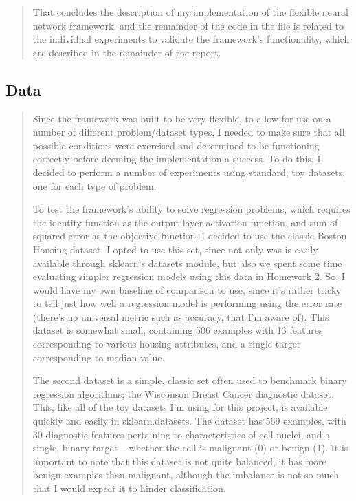 \documentclass{article}
\begin{document}
\begin{quote}
That concludes the description of my implementation of the flexible neural network framework, and the remainder of the code in the file is related to the individual experiments to validate the framework's functionality, which are described in the remainder of the report.

\end{quote}

\subsection*{Data}
\begin{quote}
\setlength{\parindent}{10ex}
\quad\quad\quad\quad Since the framework was built to be very flexible, to allow for use on a number of different problem/dataset types, I needed to make sure that all possible conditions were exercised and determined to be functioning correctly before deeming the implementation a success. To do this, I decided to perform a number of experiments using standard, toy datasets, one for each type of problem.

To test the framework's ability to solve regression problems, which requires the identity function as the output layer activation function, and sum-of-squared error as the objective function, I decided to use the classic Boston Housing dataset. I opted to use this set, since not only was is easily available through sklearn's datasets module, but also we spent some time evaluating simpler regression models using this data in Homework 2. So, I would have my own baseline of comparison to use, since it's rather tricky to tell just how well a regression model is performing using the error rate (there's no universal metric such as accuracy, that I'm aware of). This dataset is somewhat small, containing 506 examples with 13 features corresponding to various housing attributes, and a single target corresponding to median value.

The second dataset is a simple, classic set often used to benchmark binary regression algorithms; the Wisconson Breast Cancer diagnostic dataset. This, like all of the toy datasets I'm using for this project, is available quickly and easily in sklearn.datasets. The dataset has 569 examples, with 30 diagnostic features pertaining to characteristics of cell nuclei, and a single, binary target -- whether the cell is malignant (0) or benign (1). It is important to note that this dataset is not quite balanced, it has more benign examples than malignant, although the imbalance is not so much that I would expect it to hinder classification. 


\end{quote}
\end{document}
